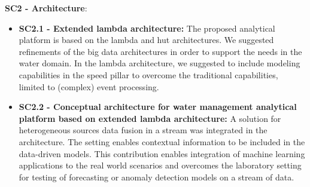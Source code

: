 \noindent \textbf{SC2 - Architecture}: 
\begin{itemize}
    \item \textbf{SC2.1 - Extended lambda architecture:}
        The proposed analytical platform is based on the lambda and hut architectures.
        We suggested refinements of the big data architectures in order to support the needs in the water domain.
        In the lambda architecture, we suggested to include modeling capabilities in the speed pillar to overcome the traditional capabilities, limited to (complex) event processing.
    \item \textbf{SC2.2 - Conceptual architecture for water management analytical platform based on extended lambda architecture:}
        A solution for heterogeneous sources data fusion in a stream was integrated in the architecture.
        The setting enables contextual information to be included in the data-driven models.
        This contribution enables integration of machine learning applications to the real world scenarios and overcomes the laboratory setting for testing of forecasting or anomaly detection models on a stream of data.
        
\end{itemize}

